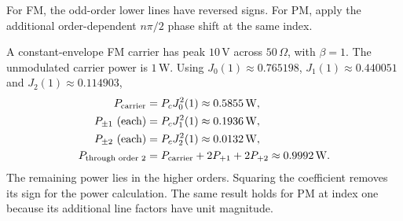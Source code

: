 \documentclass[12pt,a4paper]{article}
\begin{document}
\begin{tcolorbox}[tikzbox, unbreakable, title={FM and PM Line Magnitudes at Index One}]
\centering
{}\par
\small For FM, the odd-order lower lines have reversed signs. For PM, apply the additional order-dependent $n\pi/2$ phase shift at the same index.
\end{tcolorbox}

\begin{tcolorbox}[examplebox, title={Calculate Carrier and Sideband Power from Bessel Coefficients}]
A constant-envelope FM carrier has peak $10\,\mathrm V$ across $50\,\Omega$, with $\beta=1$. The unmodulated carrier power is $1\,\mathrm W$. Using $J_0(1)\approx0.765198$, $J_1(1)\approx0.440051$ and $J_2(1)\approx0.114903$,
\[
\begin{aligned}
 P_{\rm carrier} &= P_cJ_0^2(1)\approx0.5855\,\mathrm W,\\
 P_{\pm1}\ \text{(each)} &=P_c J_1^2(1)\approx0.1936\,\mathrm W,\\
 P_{\pm2}\ \text{(each)} &=P_c J_2^2(1)\approx0.0132\,\mathrm W,\\
 P_{\text{through order 2}}
   &=P_{\rm carrier}+2P_{+1}+2P_{+2}\approx0.9992\,\mathrm W.
\end{aligned}
\]
The remaining power lies in the higher orders. Squaring the coefficient removes its sign for the power calculation. The same result holds for PM at index one because its additional line factors have unit magnitude.
\end{tcolorbox}
\end{document}
